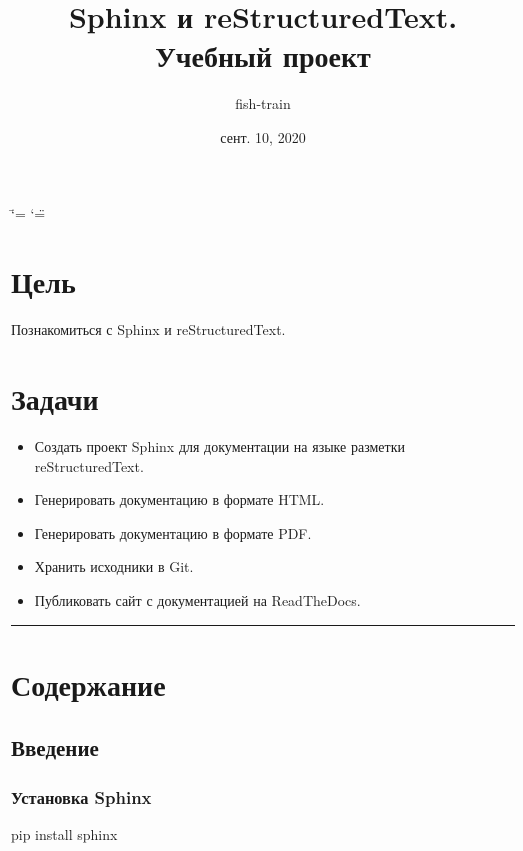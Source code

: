 \documentclass[a4paper,12pt,russian]{sphinxmanual}
\title{Sphinx и reStructuredText. Учебный проект}
\date{сент. 10, 2020}
\author{fish-train}
\begin{document}
\ifdefined\shorthandoff
  \ifnum\catcode`\=\string=\active\shorthandoff{=}\fi
  \ifnum\catcode`\"=\active{}\fi
\fi

\pagestyle{empty}
\sphinxmaketitle
\pagestyle{plain}
\sphinxtableofcontents
\pagestyle{normal}
\label{\detokenize{index::doc}}



\chapter{Цель}
\label{\detokenize{index:id1}}
Познакомиться с Sphinx и reStructuredText.


\chapter{Задачи}
\label{\detokenize{index:id2}}\begin{itemize}
\item {} 
Создать проект Sphinx для документации на языке разметки reStructuredText.

\item {} 
Генерировать документацию в формате HTML.

\item {} 
Генерировать документацию в формате PDF.

\item {} 
Хранить исходники в Git.

\item {} 
Публиковать сайт с документацией на ReadTheDocs.

\end{itemize}


\bigskip\hrule\bigskip



\chapter{Содержание}
\label{\detokenize{index:id3}}

\section{Введение}
\label{\detokenize{start:id1}}\label{\detokenize{start::doc}}

\subsection{Установка Sphinx}
\label{\detokenize{start:sphinx}}
\begin{sphinxVerbatim}[commandchars=\\\{\}]
pip install sphinx
\end{sphinxVerbatim}
\end{document}
